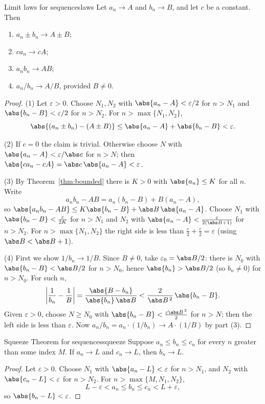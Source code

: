 \documentclass[11pt]{article}
\begin{document}
\begin{thm}{Limit laws for sequences}{laws}
Let $a_n\to A$ and $b_n\to B$, and let $c$ be a constant. Then
\begin{enumerate}[label=(\arabic*)]
  \item $a_n\pm b_n\to A\pm B$;
  \item $ca_n\to cA$;
  \item $a_nb_n\to AB$;
  \item $a_n/b_n\to A/B$, provided $B\ne0$.
\end{enumerate}
\end{thm}
\begin{proof}
(1) Let $\varepsilon>0$. Choose $N_1,N_2$ with $\abs{a_n-A}<\varepsilon/2$ for $n>N_1$ and $\abs{b_n-B}<\varepsilon/2$ for $n>N_2$. For $n>\max\{N_1,N_2\}$,
\[
\abs{(a_n\pm b_n)-(A\pm B)}\le\abs{a_n-A}+\abs{b_n-B}<\varepsilon .
\]

(2) If $c=0$ the claim is trivial. Otherwise choose $N$ with $\abs{a_n-A}<\varepsilon/\abs c$ for $n>N$; then $\abs{ca_n-cA}=\abs c\,\abs{a_n-A}<\varepsilon$.

(3) By Theorem~\ref{thm:bounded} there is $K>0$ with $\abs{a_n}\le K$ for all $n$. Write
\[
a_nb_n-AB=a_n(b_n-B)+B(a_n-A),
\]
so $\abs{a_nb_n-AB}\le K\abs{b_n-B}+\abs B\,\abs{a_n-A}$. Choose $N_1$ with $\abs{b_n-B}<\frac{\varepsilon}{2K}$ for $n>N_1$ and $N_2$ with $\abs{a_n-A}<\frac{\varepsilon}{2(\abs B+1)}$ for $n>N_2$. For $n>\max\{N_1,N_2\}$ the right side is less than $\frac\varepsilon2+\frac\varepsilon2=\varepsilon$ (using $\abs B<\abs B+1$).

(4) First we show $1/b_n\to1/B$. Since $B\ne0$, take $\varepsilon_0=\abs B/2$: there is $N_0$ with $\abs{b_n-B}<\abs B/2$ for $n>N_0$, hence $\abs{b_n}>\abs B/2$ (so $b_n\ne0$) for $n>N_0$. For such $n$,
\[
\left|\frac1{b_n}-\frac1B\right|=\frac{\abs{B-b_n}}{\abs{b_n}\,\abs B}<\frac{2}{\abs B^{\,2}}\,\abs{b_n-B}.
\]
Given $\varepsilon>0$, choose $N\ge N_0$ with $\abs{b_n-B}<\frac{\varepsilon\abs B^{\,2}}2$ for $n>N$; then the left side is less than $\varepsilon$. Now $a_n/b_n=a_n\cdot(1/b_n)\to A\cdot(1/B)$ by part (3).
\end{proof}

\begin{thm}{Squeeze Theorem for sequences}{squeeze}
Suppose $a_n\le b_n\le c_n$ for every $n$ greater than some index $M$. If $a_n\to L$ and $c_n\to L$, then $b_n\to L$.
\end{thm}
\begin{proof}
Let $\varepsilon>0$. Choose $N_1$ with $\abs{a_n-L}<\varepsilon$ for $n>N_1$, and $N_2$ with $\abs{c_n-L}<\varepsilon$ for $n>N_2$. For $n>\max\{M,N_1,N_2\}$,
\[
L-\varepsilon<a_n\le b_n\le c_n<L+\varepsilon,
\]
so $\abs{b_n-L}<\varepsilon$.
\end{proof}
\end{document}
